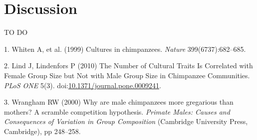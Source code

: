 \documentclass[9pt,twocolumn,twoside,]{pnas-new}
\begin{document}
\section*{Discussion}\label{discussion}

TO DO

\showmatmethods
\showacknow
\pnasbreak

\hypertarget{refs}{}
\hypertarget{ref-whiten_cultures_1999}{}
1. Whiten A, et al. (1999) Cultures in chimpanzees. \emph{Nature}
399(6737):682--685.

\hypertarget{ref-lind_number_2010}{}
2. Lind J, Lindenfors P (2010) The Number of Cultural Traits Is
Correlated with Female Group Size but Not with Male Group Size in
Chimpanzee Communities. \emph{PLoS ONE} 5(3).
doi:\href{https://doi.org/10.1371/journal.pone.0009241}{10.1371/journal.pone.0009241}.

\hypertarget{ref-wrangham_why_2000}{}
3. Wrangham RW (2000) Why are male chimpanzees more gregarious than
mothers? A scramble competition hypothesis. \emph{Primate Males: Causes
and Consequences of Variation in Group Composition} (Cambridge
University Press, Cambridge), pp 248--258.



% 
\end{document}
